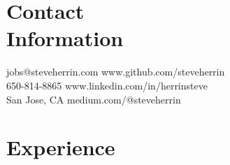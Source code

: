 \documentclass[margin,line]{resume}
\begin{document}
\begin{resume}

    \section{\mysidestyle Contact\\Information}

    jobs@steveherrin.com		\hfill www.github.com/steveherrin		\vspace{0mm}\\\vspace{0mm}%
    650-814-8865				\hfill www.linkedin.com/in/herrinsteve		\vspace{0mm}\\\vspace{-4.5mm}%
    San Jose, CA    				\hfill medium.com/@steveherrin		\vspace{0mm}\\\vspace{0mm}%

    \section{\mysidestyle Experience}


\end{resume}
\end{document}
